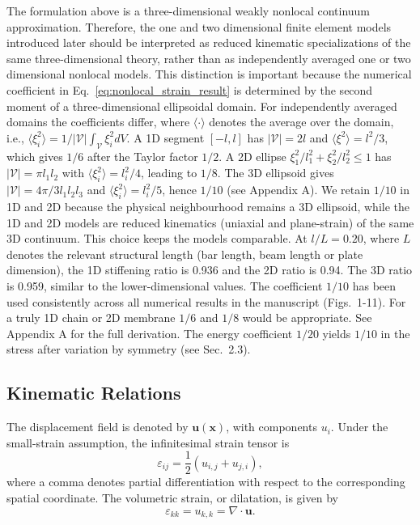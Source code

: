 \documentclass[final,3p,times,fleqn]{elsarticle}
\begin{document}
The formulation above is a three-dimensional weakly nonlocal continuum
approximation. Therefore, the one and two dimensional finite element
models introduced later should be interpreted as reduced kinematic
specializations of the same three-dimensional theory, rather than as
independently averaged one  or two dimensional nonlocal models. This
distinction is important because the numerical coefficient in
Eq.~\eqref{eq:nonlocal_strain_result} is determined by the second
moment of a three-dimensional ellipsoidal domain.
For independently averaged domains the coefficients differ, where $\langle\cdot\rangle$ denotes the average over the domain, i.e., $\langle\xi_i^2\rangle=1/|\mathcal{V}|\int_{\mathcal{V}}\xi_i^2 dV$. A 1D segment $[-l,l]$ has $|\mathcal{V}|=2l$ and $\langle\xi^2\rangle=l^2/3$, which gives $1/6$ after the Taylor factor $1/2$. A 2D ellipse $\xi_1^2/l_1^2+\xi_2^2/l_2^2\le1$ has $|\mathcal{V}|=\pi l_1l_2$ with $\langle\xi_i^2\rangle=l_i^2/4$, leading to $1/8$. The 3D ellipsoid gives $|\mathcal{V}|=4\pi/3 l_1l_2l_3$ and $\langle\xi_i^2\rangle=l_i^2/5$, hence $1/10$ (see Appendix A). We retain $1/10$ in 1D and 2D because the physical neighbourhood remains a 3D ellipsoid, while the 1D and 2D models are reduced kinematics (uniaxial and plane-strain) of the same 3D continuum. This choice keeps the models comparable. At $l/L=0.20$, where $L$ denotes the relevant structural length (bar length, beam length or plate dimension), the 1D stiffening ratio is 0.936 and the 2D ratio is 0.94. The 3D ratio is 0.959, similar to the lower-dimensional values. The coefficient $1/10$ has been used consistently across all numerical results in the manuscript (Figs.~1-11). For a truly 1D chain or 2D membrane $1/6$ and $1/8$ would be appropriate. See Appendix A for the full derivation. The energy coefficient $1/20$ yields $1/10$ in the stress after variation by symmetry (see Sec.~2.3).

\subsection{Kinematic Relations}

The displacement field is denoted by $\mathbf{u}(\mathbf{x})$, with
components $u_i$. Under the small-strain assumption, the infinitesimal
strain tensor is
\begin{equation}\label{eq:kinematic}
\varepsilon_{ij}
=
\frac{1}{2}\left(u_{i,j}+u_{j,i}\right),
\end{equation}
where a comma denotes partial differentiation with respect to the
corresponding spatial coordinate. The volumetric strain, or dilatation,
is given by
\begin{equation}\label{eq:dilatation}
\varepsilon_{kk}
=
u_{k,k}
=
\nabla\cdot\mathbf{u}.
\end{equation}
\end{document}

